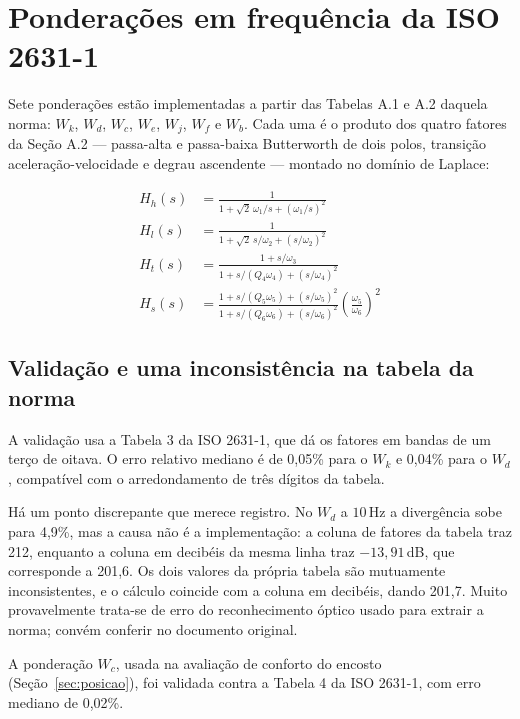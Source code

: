 \documentclass[11pt,a4paper]{article}
\newcommand{\unit}[2]{\ensuremath{#1\,\mathrm{#2}}}
\begin{document}
\section{Ponderações em frequência da ISO 2631-1}

Sete ponderações estão implementadas a partir das Tabelas A.1 e A.2 daquela
norma: $W_k$, $W_d$, $W_c$, $W_e$, $W_j$, $W_f$ e $W_b$. Cada uma é o produto
dos quatro fatores da Seção A.2 --- passa-alta e passa-baixa Butterworth de dois
polos, transição aceleração-velocidade e degrau ascendente --- montado no
domínio de Laplace:

\begin{align}
H_h(s) &= \frac{1}{1 + \sqrt{2}\,\omega_1/s + (\omega_1/s)^2} \\
H_l(s) &= \frac{1}{1 + \sqrt{2}\,s/\omega_2 + (s/\omega_2)^2} \\
H_t(s) &= \frac{1 + s/\omega_3}{1 + s/(Q_4\omega_4) + (s/\omega_4)^2} \\
H_s(s) &= \frac{1 + s/(Q_5\omega_5) + (s/\omega_5)^2}
               {1 + s/(Q_6\omega_6) + (s/\omega_6)^2}
          \left(\frac{\omega_5}{\omega_6}\right)^2
\end{align}

\subsection{Validação e uma inconsistência na tabela da norma}

A validação usa a Tabela 3 da ISO 2631-1, que dá os fatores em bandas de um
terço de oitava. O erro relativo mediano é de 0,05\% para o $W_k$ e 0,04\% para
o $W_d$, compatível com o arredondamento de três dígitos da tabela.

Há um ponto discrepante que merece registro. No $W_d$ a \unit{10}{Hz} a
divergência sobe para 4,9\%, mas a causa não é a implementação: a coluna de
fatores da tabela traz 212, enquanto a coluna em decibéis da mesma linha traz
$-13{,}91$\,dB, que corresponde a 201,6. Os dois valores da própria tabela são
mutuamente inconsistentes, e o cálculo coincide com a coluna em decibéis, dando
201,7. Muito provavelmente trata-se de erro do reconhecimento óptico usado para
extrair a norma; convém conferir no documento original.

A ponderação $W_c$, usada na avaliação de conforto do encosto
(Seção~\ref{sec:posicao}), foi validada contra a Tabela 4 da ISO 2631-1, com erro
mediano de 0,02\%.
\end{document}
